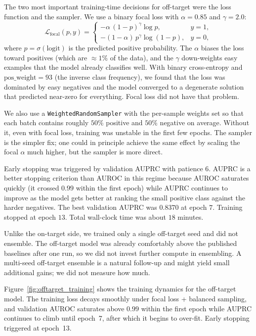\documentclass[11pt,a4paper]{article}
\begin{document}
The two most important training-time decisions for off-target were the loss function and the sampler. We use a binary focal loss with $\alpha{=}0.85$ and $\gamma{=}2.0$:
\begin{equation}
\mathcal{L}_{\text{focal}}(p, y) =
\begin{cases}
-\alpha \, (1-p)^{\gamma} \log p, & y = 1, \\
-(1-\alpha) \, p^{\gamma} \log(1-p), & y = 0,
\end{cases}
\label{eq:focal}
\end{equation}
where $p = \sigma(\text{logit})$ is the predicted positive probability. The $\alpha$ biases the loss toward positives (which are $\approx 1\%$ of the data), and the $\gamma$ down-weights easy examples that the model already classifies well. With binary cross-entropy and $\text{pos\_weight}=93$ (the inverse class frequency), we found that the loss was dominated by easy negatives and the model converged to a degenerate solution that predicted near-zero for everything. Focal loss did not have that problem.

We also use a \texttt{WeightedRandomSampler} with the per-sample weights set so that each batch contains roughly $50\%$ positive and $50\%$ negative on average. Without it, even with focal loss, training was unstable in the first few epochs. The sampler is the simpler fix; one could in principle achieve the same effect by scaling the focal $\alpha$ much higher, but the sampler is more direct.

Early stopping was triggered by validation AUPRC with patience $6$. AUPRC is a better stopping criterion than AUROC in this regime because AUROC saturates quickly (it crossed $0.99$ within the first epoch) while AUPRC continues to improve as the model gets better at ranking the small positive class against the harder negatives. The best validation AUPRC was $0.8370$ at epoch $7$. Training stopped at epoch $13$. Total wall-clock time was about $18$ minutes.

Unlike the on-target side, we trained only a single off-target seed and did not ensemble. The off-target model was already comfortably above the published baselines after one run, so we did not invest further compute in ensembling. A multi-seed off-target ensemble is a natural follow-up and might yield small additional gains; we did not measure how much.

Figure~\ref{fig:offtarget_training} shows the training dynamics for the off-target model. The training loss decays smoothly under focal loss + balanced sampling, and validation AUROC saturates above $0.99$ within the first epoch while AUPRC continues to climb until epoch~7, after which it begins to over-fit. Early stopping triggered at epoch~13.
\end{document}
